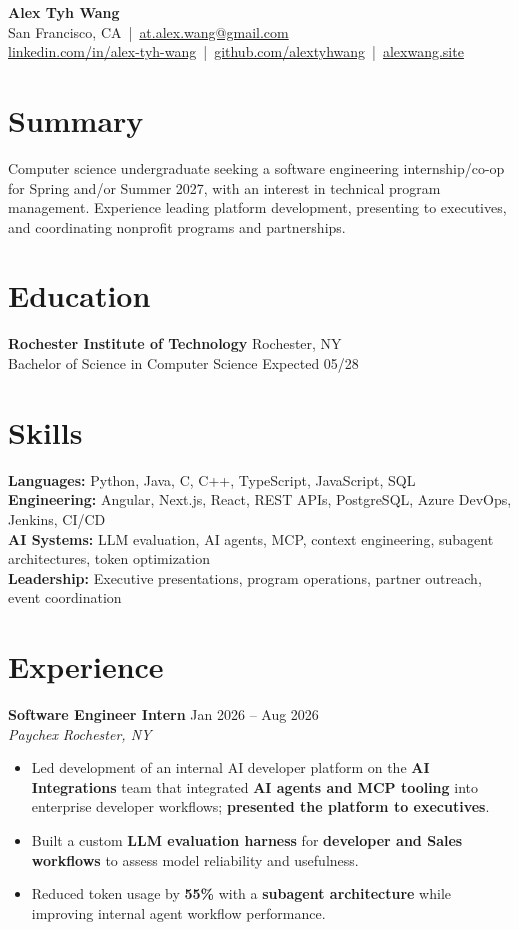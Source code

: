 \documentclass[10pt,letterpaper]{article}
\newif\ifresumeFirstRole
\newcommand{\resumeRole}[4]{%
  \ifresumeFirstRole
    \global\resumeFirstRolefalse
  \else
    \vspace{0pt plus 1fill}%
  \fi
  \textbf{#1} \hfill #2\\
  \textit{#3} \hfill \textit{#4}
}
\begin{document}
\begin{center}
{\Large \textbf{Alex Tyh Wang}}\\
San Francisco, CA \,|\, \href{mailto:at.alex.wang@gmail.com}{at.alex.wang@gmail.com}\\
\small \href{https://www.linkedin.com/in/alex-tyh-wang/}{linkedin.com/in/alex-tyh-wang} \,|\, \href{https://github.com/alextyhwang}{github.com/alextyhwang} \,|\, \href{https://alexwang.site}{alexwang.site}
\end{center}

\section*{Summary}
Computer science undergraduate seeking a software engineering internship/co-op for Spring and/or Summer 2027, with an interest in technical program management. Experience leading platform development, presenting to executives, and coordinating nonprofit programs and partnerships.

\section*{Education}
\textbf{Rochester Institute of Technology} \hfill Rochester, NY\\
Bachelor of Science in Computer Science \hfill Expected 05/28

\section*{Skills}
\textbf{Languages:} Python, Java, C, C++, TypeScript, JavaScript, SQL\\
\textbf{Engineering:} Angular, Next.js, React, REST APIs, PostgreSQL, Azure DevOps, Jenkins, CI/CD\\
\textbf{AI Systems:} LLM evaluation, AI agents, MCP, context engineering, subagent architectures, token optimization\\
\textbf{Leadership:} Executive presentations, program operations, partner outreach, event coordination

\section*{Experience}
\resumeRole{Software Engineer Intern}{Jan 2026 -- Aug 2026}{Paychex}{Rochester, NY}
\begin{itemize}
  \item Led development of an internal AI developer platform on the \textbf{AI Integrations} team that integrated \textbf{AI agents and MCP tooling} into enterprise developer workflows; \textbf{presented the platform to executives}.
  \item Built a custom \textbf{LLM evaluation harness} for \textbf{developer and Sales workflows} to assess model reliability and usefulness.
  \item Reduced token usage by \textbf{55\%} with a \textbf{subagent architecture} while improving internal agent workflow performance.
\end{itemize}
\end{document}
